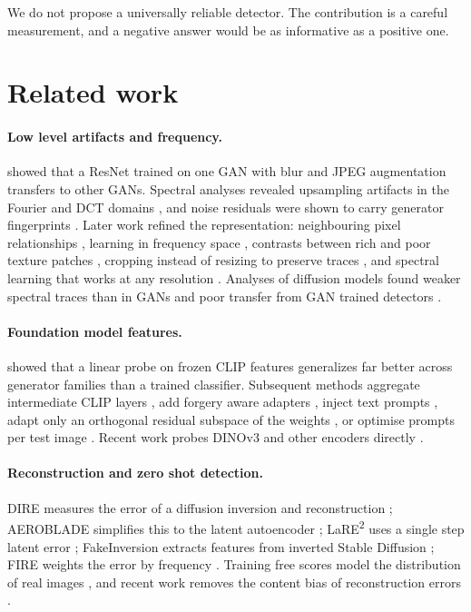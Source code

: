 \documentclass[11pt,a4paper]{article}
\begin{document}
We do not propose a universally reliable detector. The contribution is a careful measurement, and a negative answer would be as informative as a positive one.

\section{Related work}
\label{sec:related}

\paragraph{Low level artifacts and frequency.} \citet{wang2020cnnspot} showed that a ResNet trained on one GAN with blur and JPEG augmentation transfers to other GANs. Spectral analyses revealed upsampling artifacts in the Fourier and DCT domains \citep{frank2020frequency,durall2020watch}, and noise residuals were shown to carry generator fingerprints \citep{marra2019gans}. Later work refined the representation: neighbouring pixel relationships \citep{tan2024npr}, learning in frequency space \citep{tan2024freqnet}, contrasts between rich and poor texture patches \citep{zhong2023patchcraft}, cropping instead of resizing to preserve traces \citep{li2025safe}, and spectral learning that works at any resolution \citep{karageorgiou2025spai}. Analyses of diffusion models found weaker spectral traces than in GANs and poor transfer from GAN trained detectors \citep{corvi2023detection,corvi2023intriguing,ricker2024towards}.

\paragraph{Foundation model features.} \citet{ojha2023univfd} showed that a linear probe on frozen CLIP features \citep{radford2021clip} generalizes far better across generator families than a trained classifier. Subsequent methods aggregate intermediate CLIP layers \citep{koutlis2024rine}, add forgery aware adapters \citep{liu2024fatformer}, inject text prompts \citep{tan2025c2pclip}, adapt only an orthogonal residual subspace of the weights \citep{yan2025effort}, or optimise prompts per test image \citep{li2026iapl}. Recent work probes DINOv3 and other encoders directly \citep{huang2025dinov3}.

\paragraph{Reconstruction and zero shot detection.} DIRE measures the error of a diffusion inversion and reconstruction \citep{wang2023dire}; AEROBLADE simplifies this to the latent autoencoder \citep{ricker2024aeroblade}; LaRE\textsuperscript{2} uses a single step latent error \citep{luo2024lare}; FakeInversion extracts features from inverted Stable Diffusion \citep{cazenavette2024fakeinversion}; FIRE weights the error by frequency \citep{chu2025fire}. Training free scores model the distribution of real images \citep{cozzolino2024zed,he2024rigid}, and recent work removes the content bias of reconstruction errors \citep{qi2026did,choi2026rdd}.
\end{document}
